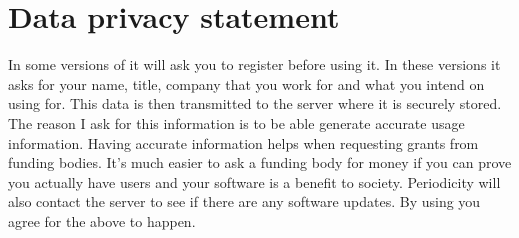 \newpage
\section{Data privacy statement}
In some versions of \simname it will ask you to register before using it.  In these versions it asks for your name, title, company that you work for and what you intend on using \simname for.  This data is then transmitted to the \simname server where it is securely stored. The reason I ask for this information is to be able generate accurate usage information. Having accurate information helps when requesting grants from funding bodies.  It's much easier to ask a funding body for money if you can prove you actually have users and your software is a benefit to society. Periodicity \simname will also contact the \simname server to see if there are any software updates. By using \simname you agree for the above to happen.

